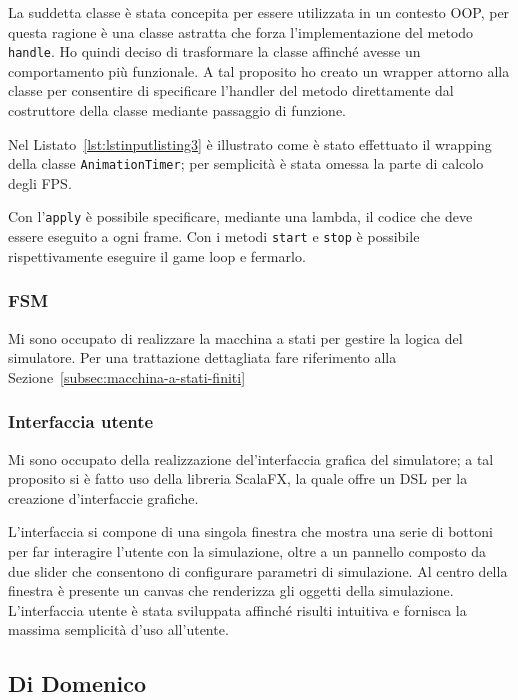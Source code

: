 La suddetta classe è stata concepita per essere utilizzata in un contesto OOP, per questa ragione è una classe astratta
che forza l'implementazione del metodo \texttt{handle}.
Ho quindi deciso di trasformare la classe affinché avesse un comportamento più funzionale.
A tal proposito ho creato un wrapper attorno alla classe per consentire di specificare l'handler del metodo direttamente
dal costruttore della classe mediante passaggio di funzione.

Nel Listato~\ref{lst:lstinputlisting3} è illustrato come è stato effettuato il wrapping della classe
\texttt{AnimationTimer}; per semplicità è stata omessa la parte di calcolo degli FPS\@.



Con l'\texttt{apply} è possibile specificare, mediante una lambda, il codice che deve essere eseguito a ogni
frame.
Con i metodi \texttt{start} e \texttt{stop} è possibile rispettivamente eseguire il game loop e fermarlo.

\subsubsection{FSM}
Mi sono occupato di realizzare la macchina a stati per gestire la logica del simulatore.
Per una trattazione dettagliata fare riferimento alla Sezione~\ref{subsec:macchina-a-stati-finiti}

\subsubsection{Interfaccia utente}
Mi sono occupato della realizzazione del'interfaccia grafica del simulatore;
a tal proposito si è fatto uso della libreria ScalaFX, la quale offre un DSL per la creazione d'interfaccie grafiche.

L'interfaccia si compone di una singola finestra che mostra una serie di bottoni per far interagire l'utente con la
simulazione, oltre a un pannello composto da due slider che consentono di configurare parametri di simulazione.
Al centro della finestra è presente un canvas che renderizza gli oggetti della simulazione.
L'interfaccia utente è stata sviluppata affinché risulti intuitiva e fornisca la massima semplicità d'uso all'utente.

\subsection{Di Domenico}\label{subsec:demo-di-domenico}

